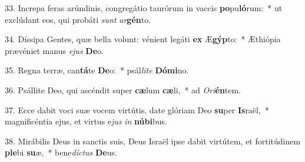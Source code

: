 33. Increpa feras arúndinis, congregátio taurórum in vaccis \textbf{po}pu\textbf{ló}rum:~*  ut exclúdant eos, qui probáti \textit{sunt} \textit{ar}\textbf{gén}to.\

34. Díssipa Gentes, quæ bella volunt: vénient legáti \textbf{ex} Æ\textbf{gýp}to:~*  Æthiópia prævéniet manus \textit{e}\textit{jus} \textbf{De}o.\

35. Regna terræ, can\textbf{tá}te \textbf{De}o:~*  psál\textit{li}\textit{te} \textbf{Dó}\textbf{mi}no.\

36. Psállite Deo, qui ascéndit super \textbf{cæ}lum \textbf{cæ}li,~*  ad \textit{O}\textit{ri}\textbf{én}tem.\

37. Ecce dabit voci suæ vocem virtútis, date glóriam Deo \textbf{su}per \textbf{Is}raël,~*  magnificéntia ejus, et virtus e\textit{jus} \textit{in} \textbf{nú}\textbf{bi}bus.\

38. Mirábilis Deus in sanctis suis, Deus Israël ipse dabit virtútem, et fortitúdinem \textbf{ple}bi \textbf{su}æ,~*  bene\textit{díc}\textit{tus} \textbf{De}us.\

